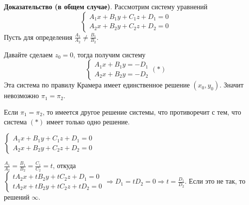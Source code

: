 \documentclass[a4paper]{article}
\begin{document}
    \begin{hproof}
        \textbf{Доказательство (в общем случае)}. Рассмотрим систему уравнений
        \begin{equation}
            \begin{cases}
                A_1x+B_1y+C_1z+D_1 = 0
                \\
                A_2x+B_2y+C_2z+D_2 = 0
            \end{cases}
        \end{equation}
        Пусть для определения $\displaystyle \frac{A_1}{A_2} \neq \frac{B_1}{B_2}$.

        Давайте сделаем $z_0=0$, тогда получим систему \begin{equation}
                                                           \begin{cases}
                                                               A_1x+B_1y = -D_1
                                                               \\
                                                               A_2x+B_2y= -D_2
                                                           \end{cases} (*)
        \end{equation}
        Эта система по правилу Крамера имеет единственное решение $(x_0, y_0)$. Значит невозможно $\pi_1 = \pi_2$.

        Если $\pi_1 = \pi_2$, то имеется другое решение системы, что противоречит с тем, что система $(*)$ имеет только одно решение.

        $\begin{cases}
             A_1x+B_1y+C_1z+D_1 = 0
             \\
             A_2x+B_2y+C_2z+D_2 = 0
        \end{cases}$

        $\displaystyle \frac{A_1}{A_2} = \frac{B_1}{B_2} = \frac{C_1}{C_2} = t$, откуда $\begin{cases}
                                                                                             tA_2x+tB_2y+tC_2z+D_1 = 0
                                                                                             \\
                                                                                             tA_2x+tB_2y+tC_2z+tD_2 = 0
        \end{cases} \Rightarrow D_1 = tD_2 = 0 \Rightarrow \displaystyle t = \frac{D_1}{D_2}$. Если это не так, то решений $\infty$.
    \end{hproof}
\end{document}
